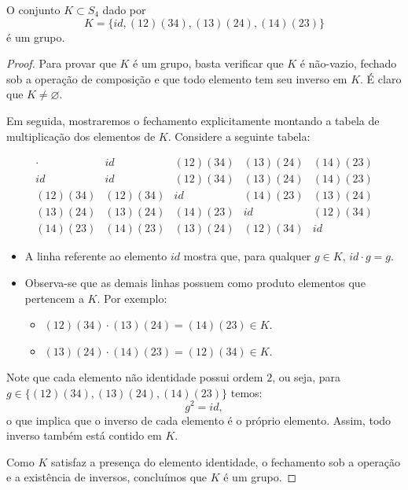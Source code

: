 \documentclass[11pt,openany]{book}
\newenvironment{novo}{
    \color{red}
}{}
\begin{document}
\begin{novo}
\begin{proposition}
    O conjunto $K \subset S_4$ dado por\
    \[K = \{id, (12)(34), (13)(24), (14)(23)\}\]
    é um grupo.
\end{proposition}

\begin{proof}
    Para provar que \(K\) é um grupo, basta verificar que \(K\) é não-vazio, fechado sob a operação de composição e que todo elemento tem seu inverso em \(K\). É claro que \(K \neq \varnothing\).

    Em seguida, mostraremos o fechamento explicitamente montando a tabela de multiplicação dos elementos de \(K\). Considere a seguinte tabela:

    \[
    \begin{array}{c|cccc}
       \cdot       & id              & (12)(34)      & (13)(24)      & (14)(23)\\ \hline
       id          & id              & (12)(34)      & (13)(24)      & (14)(23) \\
       (12)(34)    & (12)(34)       & id            & (14)(23)      & (13)(24) \\
       (13)(24)    & (13)(24)       & (14)(23)     & id            & (12)(34) \\
       (14)(23)    & (14)(23)       & (13)(24)     & (12)(34)     & id
    \end{array}
    \]

    \begin{itemize}
      \item A linha referente ao elemento \(id\) mostra que, para qualquer \(g \in K\), \(id \cdot g = g\).
      \item Observa-se que as demais linhas possuem como produto elementos que pertencem a \(K\). Por exemplo:
        \begin{itemize}
          \item \((12)(34) \cdot (13)(24) = (14)(23) \in K\).
          \item \((13)(24) \cdot (14)(23) = (12)(34) \in K\).
        \end{itemize}
    \end{itemize}

    Note que cada elemento não identidade possui ordem \(2\), ou seja, para \(g \in \{(12)(34), (13)(24), (14)(23)\}\) temos:
    \[
    g^2 = id,
    \]
    o que implica que o inverso de cada elemento é o próprio elemento. Assim, todo inverso também está contido em \(K\).

    Como \(K\) satisfaz a presença do elemento identidade, o fechamento sob a operação e a existência de inversos, concluímos que \(K\) é um grupo.
\end{proof}
\end{novo}
\end{document}
